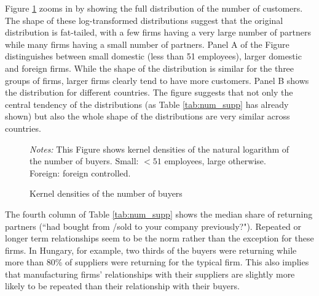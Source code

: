 \usepackage{}\documentclass[final, dvipsnames, authoryear,12pt]{elsarticle}
\begin{document}
Figure \ref{fig:kernel} zooms in by showing the full distribution of the number of customers. The shape of these log-transformed distributions suggest that the original distribution is fat-tailed, with a few firms having a very large number of partners while many firms having a small number of partners. Panel A of the Figure distinguishes between small domestic (less than 51 employees), larger domestic and foreign firms. While the shape of the distribution is similar for the three groups of firms, larger firms clearly tend to have more customers. Panel B shows the distribution for different countries. The figure suggests that not only the central tendency of the distributions (as Table \ref{tab:num_supp} has already shown) but also the whole shape of the distributions are very similar across countries.


\begin{figure}[h]    
    \begin{center}
    \caption{Kernel densities of the number of buyers}
    \label{fig:kernel}       
    \end{center}
    {\footnotesize \textit{Notes:} This Figure shows kernel densities of the natural logarithm of the number of buyers. Small: $< 51$ employees, large otherwise. Foreign: foreign controlled.}
\end{figure}


The fourth column of Table \ref{tab:num_supp} shows the median share of returning partners (``had bought from /sold to your company previously?"). Repeated or longer term relationships seem to be the norm rather than the exception for these firms. In Hungary, for example,  two thirds of the buyers were returning while more than 80\% of suppliers were returning for the typical firm. This also implies that manufacturing firms' relationships with their suppliers are slightly more likely to be repeated than their relationship with their buyers.
\end{document}
